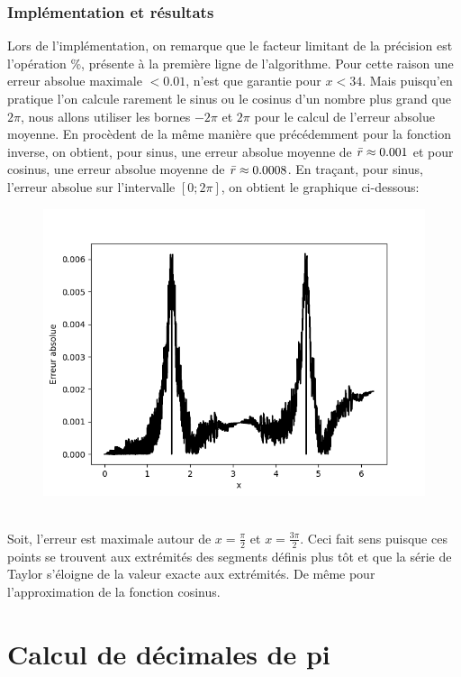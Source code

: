 \documentclass{article}
\begin{document}
\subsubsection{Implémentation et résultats} 
Lors de l'implémentation, on remarque que le facteur limitant de la précision est l'opération \%, présente à la première ligne de l'algorithme. Pour cette raison une erreur absolue maximale $< 0.01$, n'est que garantie pour $x<34$. Mais puisqu'en pratique l'on calcule rarement le sinus ou le cosinus d'un nombre plus grand que $2\pi$, nous allons utiliser les bornes $-2\pi$ et $2\pi$ pour le calcul de l'erreur absolue moyenne. En procèdent de la même manière que précédemment pour la fonction inverse, on obtient, pour sinus, une erreur absolue moyenne de $\Bar{r}\approx 0.001$ et pour cosinus, une erreur absolue moyenne de $\Bar{r}\approx0.0008$.
\newpage
En traçant, pour sinus, l'erreur absolue sur l'intervalle $[0;2\pi]$, on obtient le graphique ci-dessous:
\begin{figure}[htp]
    \centering
    \includegraphics[width=12cm]{images/graph_sin.png}
    \label{fig:graph_sin.png}
\end{figure}\\
Soit, l'erreur est maximale autour de $x=\frac{\pi}{2}$ et $x=\frac{3\pi}{2}$. Ceci fait sens puisque ces points se trouvent aux extrémités des segments définis plus tôt et que la série de Taylor s'éloigne de la valeur exacte aux extrémités. De même pour l'approximation de la fonction cosinus.
\section{Calcul de décimales de pi}
\end{document}
